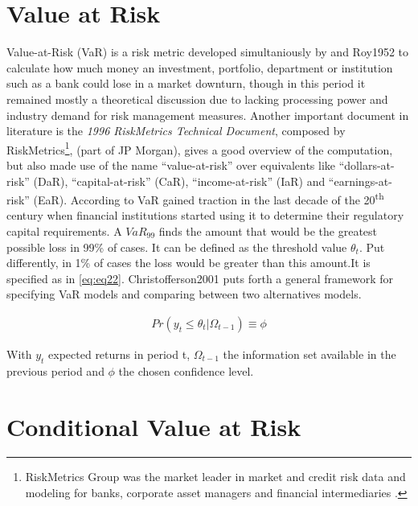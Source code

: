 \documentclass[a4paper, nobind]{templates/ociamthesis}
\begin{document}
\hypertarget{value-at-risk}{%
\section{Value at Risk}\label{value-at-risk}}

Value-at-Risk (VaR) is a risk metric developed simultaniously by \textcite{markowitz1952} and Roy1952 to calculate how much money an investment, portfolio, department or institution such as a bank could lose in a market downturn, though in this period it remained mostly a theoretical discussion due to lacking processing power and industry demand for risk management measures. Another important document in literature is the \emph{1996 RiskMetrics Technical Document}, composed by RiskMetrics\footnote{RiskMetrics Group was the market leader in market and credit risk data and modeling for banks, corporate asset managers and financial intermediaries \autocite{alexander2008}.}, \textcite{morganguarantytrustcompany1996} (part of JP Morgan), gives a good overview of the computation, but also made use of the name ``value-at-risk'' over equivalents like ``dollars-at-risk'' (DaR), ``capital-at-risk'' (CaR), ``income-at-risk'' (IaR) and ``earnings-at-risk'' (EaR). According to \textcite{holton2002} VaR gained traction in the last decade of the 20\textsuperscript{th} century when financial institutions started using it to determine their regulatory capital requirements. A \(VaR_{99}\) finds the amount that would be the greatest possible loss in 99\% of cases. It can be defined as the threshold value \(\theta_t\). Put differently, in 1\% of cases the loss would be greater than this amount.It is specified as in \eqref{eq:eq22}. Christofferson2001 puts forth a general framework for specifying VaR models and comparing between two alternatives models.

\begin{align}
Pr(y_t \le \theta_t | \Omega_{t-1}) \equiv \phi
 \label{eq:eq22}
\end{align}

With \(y_t\) expected returns in period t, \(\Omega_{t-1}\) the information set available in the previous period and \(\phi\) the chosen confidence level.

\hypertarget{conditional-value-at-risk}{%
\section{Conditional Value at Risk}\label{conditional-value-at-risk}}
\end{document}
